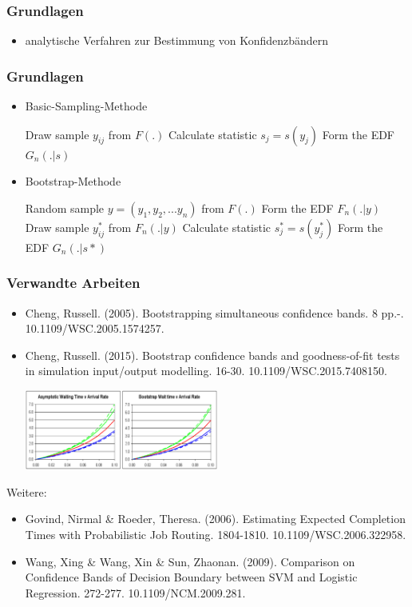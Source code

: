 \documentclass[aspectratio=1610, 9pt]{beamer}
\begin{document}
\begin{frame}
  \frametitle{Grundlagen}
  \begin{itemize}
    \item analytische Verfahren zur Bestimmung von Konfidenzbändern
  \end{itemize}
\end{frame}

\begin{frame}
  \frametitle{Grundlagen}
  \begin{itemize}
    \item Basic-Sampling-Methode \\
    \begin{algorithmic}
				  \State Draw sample $y_{ij}$ from $F(.)$
				\EndFor
				\State Calculate statistic $s_j = s(y_j)$
			\EndFor
			\State Form the EDF $G_n(.|s)$
	  \end{algorithmic}
    \item Bootstrap-Methode \\
    \begin{algorithmic}
      \Require Random sample $y = (y_1, y_2, ...y_n)$ from $F(.)$
      \State Form the EDF $F_n(.|y)$
				  \State Draw sample $y^*_{ij}$ from $F_n(.|y)$
				\EndFor
				\State Calculate statistic $s^*_j = s(y^*_j)$
			\EndFor
			\State Form the EDF $G_n(.|s*)$
	  \end{algorithmic}
  \end{itemize}
\end{frame}

\begin{frame}
  \frametitle{Verwandte Arbeiten} 
  \begin{itemize}
    \item Cheng, Russell. (2005). Bootstrapping simultaneous confidence bands. 8 pp.-. 10.1109/WSC.2005.1574257.
    \item Cheng, Russell. (2015). Bootstrap confidence bands and goodness-of-fit tests in simulation input/output modelling. 16-30. 10.1109/WSC.2015.7408150.
    \begin{center}
      \includegraphics[width=0.5\textwidth]{images/3.png}
    \end{center}
  \end{itemize}
  Weitere:
  \begin{itemize}
    \item Govind, Nirmal \& Roeder, Theresa. (2006). Estimating Expected Completion Times with Probabilistic Job Routing. 1804-1810. 10.1109/WSC.2006.322958. 
    \item Wang, Xing \& Wang, Xin \& Sun, Zhaonan. (2009). Comparison on Confidence Bands of Decision Boundary between SVM and Logistic Regression. 272-277. 10.1109/NCM.2009.281.
  \end{itemize}
\end{frame}
\end{document}
